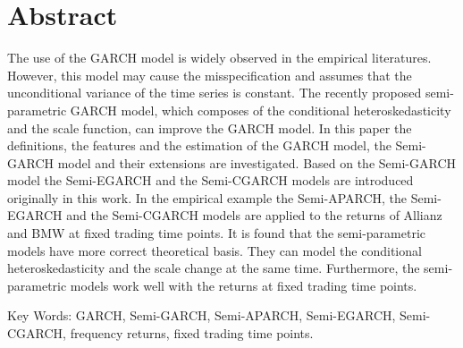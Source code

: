 \chapter*{\centering Abstract}\label{secAbstrct}

The use of the GARCH model is widely observed in the empirical literatures. However, this model may cause the misspecification and assumes that the unconditional variance of the time series is constant. The recently proposed semi-parametric GARCH model, which composes of the conditional heteroskedasticity and the scale function, can improve the GARCH model. In this paper the definitions, the features and the estimation of the GARCH model, the Semi-GARCH model and their extensions are investigated. Based on the Semi-GARCH model the Semi-EGARCH and the Semi-CGARCH models are introduced originally in this work. In the empirical example the Semi-APARCH, the Semi-EGARCH and the Semi-CGARCH models are applied to the returns of Allianz and BMW at fixed trading time points. It is found that the semi-parametric models have more correct theoretical basis. They can model the conditional heteroskedasticity and the scale change at the same time. Furthermore, the semi-parametric models work well with the returns at fixed trading time points.

Key Words: GARCH, Semi-GARCH, Semi-APARCH, Semi-EGARCH, Semi-CGARCH, frequency returns, fixed trading time points.
